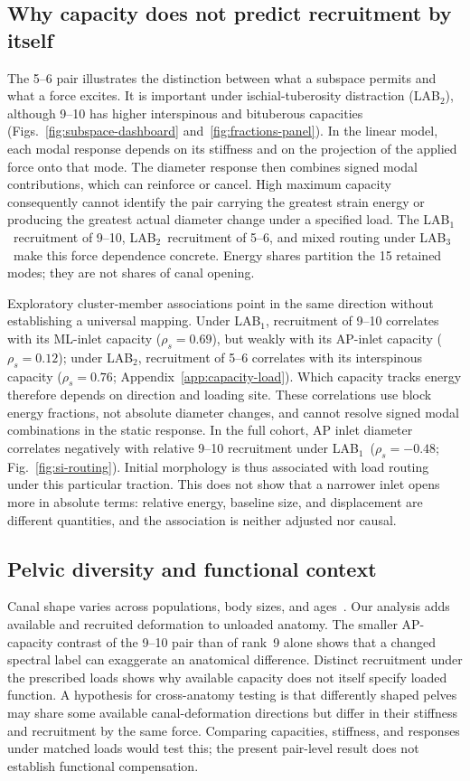 \documentclass[pdflatex,sn-basic]{sn-jnl}
\newcommand{\LABone}{LAB$_1$}
\newcommand{\LABtwo}{LAB$_2$}
\newcommand{\LABthree}{LAB$_3$}
\begin{document}
\subsection{Why capacity does not predict recruitment by itself}
The 5--6 pair illustrates the distinction between what a subspace permits and what a force excites. It is important under ischial-tuberosity distraction (\LABtwo), although 9--10 has higher interspinous and bituberous capacities (Figs.~\ref{fig:subspace-dashboard} and~\ref{fig:fractions-panel}). In the linear model, each modal response depends on its stiffness and on the projection of the applied force onto that mode. The diameter response then combines signed modal contributions, which can reinforce or cancel. High maximum capacity consequently cannot identify the pair carrying the greatest strain energy or producing the greatest actual diameter change under a specified load. The \LABone\ recruitment of 9--10, \LABtwo\ recruitment of 5--6, and mixed routing under \LABthree\ make this force dependence concrete. Energy shares partition the 15 retained modes; they are not shares of canal opening.

Exploratory cluster-member associations point in the same direction without establishing a universal mapping. Under \LABone, recruitment of 9--10 correlates with its ML-inlet capacity ($\rho_s=0.69$), but weakly with its AP-inlet capacity ($\rho_s=0.12$); under \LABtwo, recruitment of 5--6 correlates with its interspinous capacity ($\rho_s=0.76$; Appendix~\ref{app:capacity-load}). Which capacity tracks energy therefore depends on direction and loading site. These correlations use block energy fractions, not absolute diameter changes, and cannot resolve signed modal combinations in the static response. In the full cohort, AP inlet diameter correlates negatively with relative 9--10 recruitment under \LABone\ ($\rho_s=-0.48$; Fig.~\ref{fig:si-routing}). Initial morphology is thus associated with load routing under this particular traction. This does not show that a narrower inlet opens more in absolute terms: relative energy, baseline size, and displacement are different quantities, and the association is neither adjusted nor causal.

\subsection{Pelvic diversity and functional context}
Canal shape varies across populations, body sizes, and ages~\citep{BettiManica2018,FischerMitteroecker2015,Huseynov2016}. Our analysis adds available and recruited deformation to unloaded anatomy. The smaller AP-capacity contrast of the 9--10 pair than of rank~9 alone shows that a changed spectral label can exaggerate an anatomical difference. Distinct recruitment under the prescribed loads shows why available capacity does not itself specify loaded function. A hypothesis for cross-anatomy testing is that differently shaped pelves may share some available canal-deformation directions but differ in their stiffness and recruitment by the same force. Comparing capacities, stiffness, and responses under matched loads would test this; the present pair-level result does not establish functional compensation.
\end{document}
